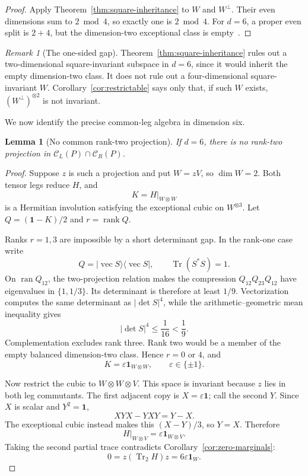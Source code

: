 \documentclass[11pt]{article}
\newtheorem{lemma}[theorem]{Lemma}
\theoremstyle{definition}
\theoremstyle{remark}
\newtheorem{remark}[theorem]{Remark}
\newcommand{\Id}{\mathbf 1}
\newcommand{\Tr}{\operatorname{Tr}}
\newcommand{\rank}{\operatorname{rank}}
\newcommand{\cC}{\mathcal C}
\begin{document}
\begin{proof}
Apply Theorem~\ref{thm:square-inheritance} to \(W\) and \(W^\perp\).
Their even dimensions sum to \(2\bmod4\), so exactly one is
\(2\bmod4\). For \(d=6\), a proper even split is \(2+4\), but the
dimension-two exceptional class is empty~\cite{Lechner2026}.
\end{proof}

\begin{remark}[The one-sided gap]\label{rem:one-sided-gap}
Theorem~\ref{thm:square-inheritance} rules out a two-dimensional
square-invariant subspace in \(d=6\), since it would inherit the empty
dimension-two class. It does not rule out a four-dimensional
square-invariant \(W\). Corollary~\ref{cor:restrictable} says only that,
if such \(W\) exists, \((W^\perp)^{\otimes2}\) is not invariant.
\end{remark}

We now identify the precise common-leg algebra in dimension six.

\begin{lemma}[No common rank-two projection]\label{lem:no-common-rank2}
If \(d=6\), there is no rank-two projection in
\(\cC_L(P)\cap\cC_R(P)\).
\end{lemma}

\begin{proof}
Suppose \(z\) is such a projection and put \(W=zV\), so \(\dim W=2\).
Both tensor legs reduce \(H\), and
\[
  K=H|_{W\otimes W}
\]
is a Hermitian involution satisfying the exceptional cubic on
\(W^{\otimes3}\). Let \(Q=(\Id-K)/2\) and \(r=\rank Q\).

Ranks \(r=1,3\) are impossible by a short determinant gap. In the
rank-one case write
\[
 Q=|\operatorname{vec}S\rangle
   \langle\operatorname{vec}S|,
 \qquad \Tr(S^*S)=1.
\]
On \(\operatorname{ran}Q_{12}\), the two-projection relation makes the
compression \(Q_{12}Q_{23}Q_{12}\) have eigenvalues in
\(\{1,1/3\}\). Its determinant is therefore at least \(1/9\).
Vectorization computes the same determinant as \(|\det S|^4\), while
the arithmetic--geometric mean inequality gives
\[
 |\det S|^4\le\frac1{16}<\frac19.
\]
Complementation excludes rank three. Rank two would be a member of the
empty balanced dimension-two class. Hence \(r=0\) or \(4\), and
\[
  K=\varepsilon\Id_{W\otimes W},
  \qquad\varepsilon\in\{\pm1\}.
\]

Now restrict the cubic to \(W\otimes W\otimes V\). This space is invariant
because \(z\) lies in both leg commutants. The first adjacent copy is
\(X=\varepsilon\Id\); call the second \(Y\). Since \(X\) is scalar and
\(Y^2=\Id\),
\[
 XYX-YXY=Y-X.
\]
The exceptional cubic instead makes this \((X-Y)/3\), so \(Y=X\).
Therefore
\[
  H|_{W\otimes V}=\varepsilon\Id_{W\otimes V}.
\]
Taking the second partial trace contradicts
Corollary~\ref{cor:zero-marginals}:
\[
  0=z(\Tr_2H)z=6\varepsilon\Id_W.
\]
\end{proof}
\end{document}
